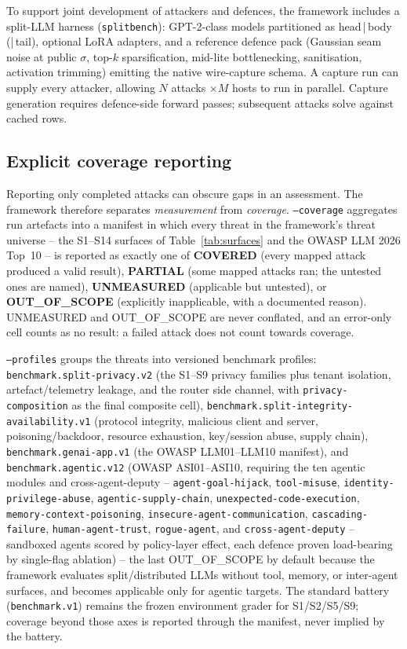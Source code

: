 \documentclass[11pt]{article}
\newcommand{\attack}[1]{\nolinkurl{#1}}
\begin{document}
To support joint development of attackers and defences, the framework includes a
split-LLM harness (\texttt{splitbench}): GPT-2-class models partitioned as
head\,|\,body\,(|\,tail), optional LoRA adapters, and a reference defence
pack (Gaussian seam noise at public $\sigma$, top-$k$ sparsification,
mid-lite bottlenecking, sanitisation, activation trimming) emitting the
native wire-capture schema. A capture run can supply every attacker, allowing
$N$ attacks $\times M$ hosts to run in parallel. Capture generation requires
defence-side forward passes; subsequent attacks solve against cached rows.

\subsection{Explicit coverage reporting}
\label{sec:coverage}

Reporting only completed attacks can obscure gaps in an assessment. The framework therefore separates \emph{measurement} from
\emph{coverage}. \texttt{--coverage} aggregates run artefacts into a
manifest in which every threat in the framework's threat universe -- the
S1--S14 surfaces of Table~\ref{tab:surfaces} and the OWASP LLM 2026
Top~10 \cite{owasp2026asi} -- is reported as exactly one of \textbf{COVERED} (every mapped
attack produced a valid result), \textbf{PARTIAL} (some mapped attacks
ran; the untested ones are named), \textbf{UNMEASURED} (applicable but
untested), or \textbf{OUT\_OF\_SCOPE} (explicitly inapplicable, with a
documented reason). UNMEASURED and OUT\_OF\_SCOPE are never conflated,
and an error-only cell counts as no result: a failed attack does not
count towards coverage.

\texttt{--profiles} groups the threats into versioned benchmark profiles:
\texttt{benchmark.split-privacy.v2} (the S1--S9 privacy families plus
tenant isolation, artefact/telemetry leakage, and the router side channel,
with \attack{privacy-composition} as the final composite cell),
\nolinkurl{benchmark.split-integrity-availability.v1} (protocol integrity,
malicious client and server, poisoning/backdoor, resource exhaustion,
key/session abuse, supply chain), \texttt{benchmark.genai-app.v1} (the
OWASP LLM01--LLM10 manifest), and \texttt{benchmark.agentic.v12} (OWASP
ASI01--ASI10, requiring the ten agentic modules and cross-agent-deputy -- \attack{agent-goal-hijack}, \attack{tool-misuse},
\attack{identity-privilege-abuse}, \attack{agentic-supply-chain},
\attack{unexpected-code-execution}, \attack{memory-context-poisoning},
\attack{insecure-agent-communication}, \attack{cascading-failure},
\attack{human-agent-trust}, \attack{rogue-agent}, and \attack{cross-agent-deputy} -- sandboxed agents scored by policy-layer effect, each defence proven
load-bearing by single-flag ablation) -- the last OUT\_OF\_SCOPE by
default because the framework
evaluates split/distributed LLMs without tool, memory, or inter-agent
surfaces, and becomes applicable only for agentic targets. The standard
battery (\texttt{benchmark.v1}) remains the frozen environment grader for
S1/S2/S5/S9; coverage beyond those axes is reported through the manifest,
never implied by the battery.
\end{document}

